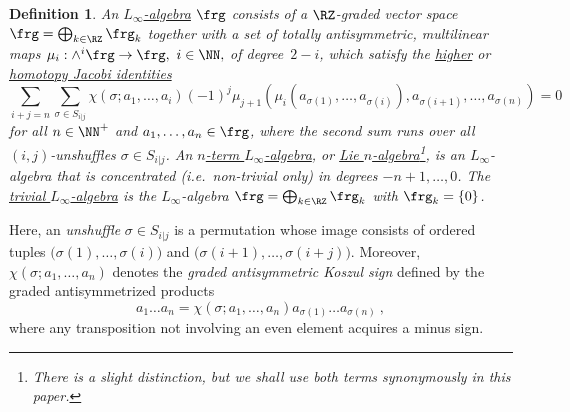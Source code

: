 \documentclass[reqno,a4paper,11pt]{article}
\let\fn\footnote
\renewcommand{\footnote}[1]{\linespread{1.1}\fn{#1}\linespread{1.29}}
\newtheorem{definition}[thm]{Definition}
\begin{document}
\begin{definition}
 An \underline{$L_\infty$-algebra} $\frg$ consists of a $\RZ$-graded vector space $\frg = \bigoplus_{k\in \RZ} \frg_k$ together with a set of totally antisymmetric, multilinear maps \mbox{$\mu_i :  \wedge^i \frg \to \frg,~i\in \NN,$} of degree~$2-i$, which satisfy the \underline{higher} or \underline{homotopy Jacobi identities}
\begin{equation}\label{eq:hom_rel}
 \sum_{i+j=n}\sum_{\sigma\in S_{i|j}}\chi(\sigma;a_1,\ldots,a_{i})(-1)^{j}\mu_{j+1}(\mu_i(a_{\sigma(1)},\ldots,a_{\sigma(i)}),a_{\sigma(i+1)},\ldots,a_{\sigma(n)})=0
\end{equation}
for all $n\in\NN^+$ and $a_1,\dots,a_n\in \frg$, where the second sum runs over all $(i,j)$-unshuffles $\sigma\in S_{i|j}$. An \underline{$n$-term $L_\infty$-algebra}, or \underline{Lie $n$-algebra}\footnote{There is a slight distinction, but we shall use both terms synonymously in this paper.}, is an $L_\infty$-algebra that is concentrated (i.e.~non-trivial only) in degrees $-n+1,\dots,0$. The \underline{trivial $L_\infty$-algebra} is the $L_\infty$-algebra $\frg=\bigoplus_{k\in\RZ}\frg_k$ with $\frg_k=\{0\}$.
\end{definition}
Here, an {\em unshuffle} $\sigma\in S_{i|j}$ is a permutation whose image consists of ordered tuples $\big(\sigma(1),\dots,\sigma(i)\big)$ and $\big(\sigma(i+1),\dots,\sigma(i+j)\big)$. Moreover, $\chi(\sigma; a_1,\dots,a_n)$ denotes the {\em graded antisymmetric Koszul sign} defined by the graded antisymmetrized products
\begin{equation}
a_1 \dots   a_n = \chi(\sigma;a_1,\dots,a_n)a_{\sigma(1)} \dots  a_{\sigma(n)}~,
\end{equation}
where any transposition not involving an even element acquires a minus sign. 
\end{document}
